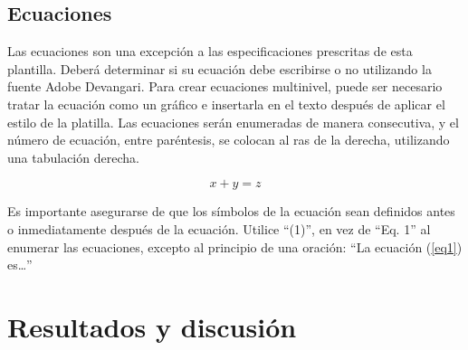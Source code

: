     \subsection{Ecuaciones}
    
    Las ecuaciones son una excepción a las especificaciones prescritas de esta plantilla. 
    Deberá determinar si su ecuación debe escribirse o no utilizando la fuente Adobe Devangari. 
    Para crear ecuaciones multinivel, puede ser necesario tratar la ecuación como un gráfico e insertarla en el texto después de aplicar el estilo de la platilla.
    Las ecuaciones serán enumeradas de manera consecutiva, y el número de ecuación, entre paréntesis, se colocan al ras de la derecha, utilizando una tabulación derecha. 
    
    \begin{equation}
        \label{eq1}
        x + y = z 
    \end{equation}
    
    Es importante asegurarse de que los símbolos de la ecuación sean definidos antes o inmediatamente después de la ecuación. Utilice “(1)”, en vez de “Eq. 1” al enumerar las ecuaciones, excepto al principio de una oración: “La ecuación (\ref{eq1}) es…”
    
    \section{Resultados y discusión}
    
